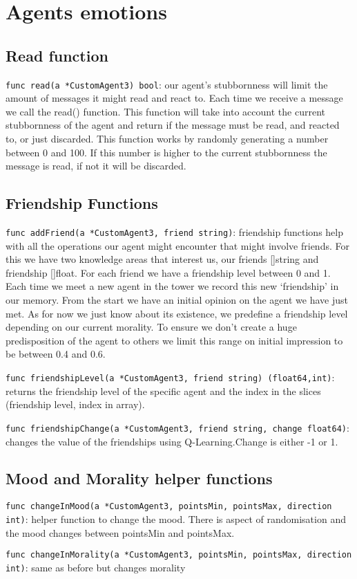 \section{Agents emotions}\label{agents_emotions}

\subsection{Read function}
\texttt{func read(a *CustomAgent3) bool}: our agent's stubbornness will limit the amount of messages it might read and react to. Each time we receive a message we call the read() function. This function will take into account the current stubbornness of the agent and return if the message must be read, and reacted to, or just discarded. 
This function works by randomly generating a number between 0 and 100. If this number is higher to the current stubbornness the message is read, if not it will be discarded. 

\subsection{Friendship Functions}
\texttt{func addFriend(a *CustomAgent3, friend string)}: friendship functions help with all the operations our agent might encounter that might involve friends. For this we have two knowledge areas that interest us, our friends []string and friendship []float. For each friend we have a friendship level between 0 and 1.
Each time we meet a new agent in the tower we record this new ‘friendship’ in our memory. From the start we have an initial opinion on the agent we have just met. As for now we just know about its existence, we predefine a friendship level depending on our current morality. To ensure we don’t create a huge predisposition of the agent to others we limit this range on initial impression to be between 0.4 and 0.6. \par

\texttt{func friendshipLevel(a *CustomAgent3, friend string) (float64,int)}: returns the friendship level of the specific agent  and the index in the slices (friendship level, index in array). \par

\texttt{func friendshipChange(a *CustomAgent3, friend string, change float64)}: changes the value of the friendships using Q-Learning.Change is either -1 or 1. \par

\subsection{Mood and Morality helper functions}
\texttt{func changeInMood(a *CustomAgent3, pointsMin, pointsMax, direction int)}: helper function to change the mood. There is aspect of randomisation and the mood changes between pointsMin and pointsMax. \par

\texttt{func changeInMorality(a *CustomAgent3, pointsMin, pointsMax, direction int)}: same as before but changes morality
